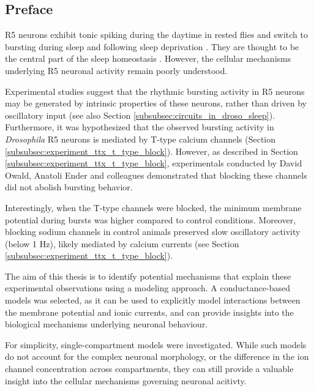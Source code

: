 \documentclass[../main.tex]{subfiles}
\begin{document}
\subsection{Preface} \label{subsec:results_preface}

R5 neurons exhibit tonic spiking during the daytime in rested flies and switch to bursting during sleep and following sleep deprivation \parencite{liuSleepDriveEncoded2016,raccugliaCoherentMultilevelNetwork2022,raccugliaNetworkSpecificSynchronizationElectrical2019}. They are thought to be the central part of the sleep homeostasis \parencite{liuSleepDriveEncoded2016}.
However, the cellular mechanisms underlying R5 neuronal activity remain poorly understood.

Experimental studies suggest that the rhythmic bursting activity in R5 neurons may be generated by intrinsic properties of these neurons, rather than driven by oscillatory input \parencite{raccugliaNetworkSpecificSynchronizationElectrical2019} (see also Section \ref{subsubsec:circuits_in_droso_sleep}).
Furthermore, it was hypothesized that the observed bursting activity in \textit{Drosophila} R5 neurons is mediated by T-type calcium channels (Section \ref{subsubsec:experiment_ttx_t_type_block}). However, as described in Section \ref{subsubsec:experiment_ttx_t_type_block}, experimentals conducted by David Owald, Anatoli Ender and colleagues demonstrated that blocking these channels did not abolish bursting behavior.

Interestingly, when the T-type channels were blocked, the minimum membrane potential during bursts was higher compared to control conditions. Moreover, blocking sodium channels in control animals preserved slow oscillatory activity (below 1 Hz), likely mediated by calcium currents (see Section \ref{subsubsec:experiment_ttx_t_type_block}).

The aim of this thesis is to identify potential mechanisms that explain these experimental observations using a modeling approach. A conductance-based models was selected, as it can be used to explicitly model interactions between the membrane potential and ionic currents, and can provide insights into the biological mechanisms underlying neuronal behaviour.

For simplicity, single-compartment models were investigated. While such models do not account for the complex neuronal morphology, or the difference in the ion channel concentration across compartments, they can still provide a valuable insight into the cellular mechanisms governing neuronal acitivty.
\end{document}
